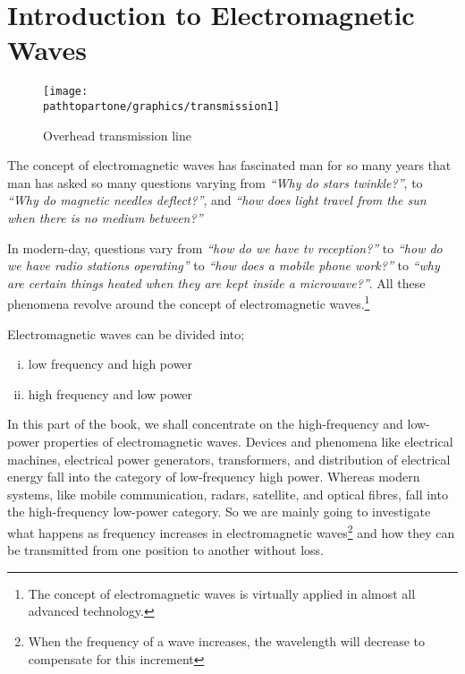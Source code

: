 \chapter{Introduction to Electromagnetic Waves}\label{lec:lec1}
\begin{figure}[h]
\centering
\texttt{[image: \\pathtopartone/graphics/transmission1]}
\caption{Overhead transmission line}
\end{figure}

The concept of electromagnetic waves has fascinated man for so many years that man has asked so many questions varying from \emph{\textquotedblleft Why do stars twinkle?\textquotedblright}, to \emph{\textquotedblleft Why do magnetic needles deflect?\textquotedblright}, and \emph{\textquotedblleft how does light travel from the sun when there is no medium between?\textquotedblright}

In modern-day, questions vary from \emph{\textquotedblleft how do we have tv reception?\textquotedblright} to \emph{\textquotedblleft how do we have radio stations operating\textquotedblright} to \emph{\textquotedblleft how does a mobile phone work?\textquotedblright} to \emph{\textquotedblleft why are certain things heated when they are kept inside a microwave?\textquotedblright}. All these phenomena revolve around the concept of electromagnetic waves.\footnote{The concept of electromagnetic waves is virtually applied in almost all advanced technology.}

Electromagnetic waves can be divided into;
\begin{enumerate}[(i)]
\item low frequency and high power
\item high frequency and low power
\end{enumerate}

In this part of the book, we shall concentrate on the high-frequency and low-power properties of electromagnetic waves. Devices and phenomena like electrical machines, electrical power generators, transformers, and distribution of electrical energy fall into the category of low-frequency high power. Whereas modern systems, like mobile communication, radars, satellite, and optical fibres, fall into the high-frequency low-power category. So we are mainly going to investigate what happens as frequency increases in electromagnetic waves\footnote{
When the frequency of a wave increases, the wavelength will decrease to compensate for this increment
} and how they can be transmitted from one position to another without loss.

